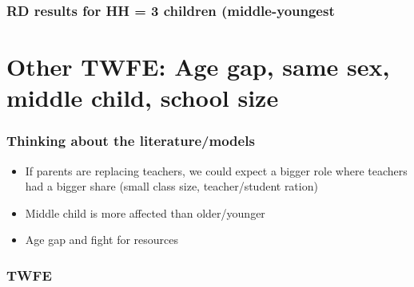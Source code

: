 \documentclass{beamer}
\begin{document}
\begin{frame}
    \frametitle{RD results for HH = 3 children (middle-youngest}
    
\end{frame}



\section{Other TWFE: Age gap, same sex, middle child, school size}

\begin{frame}
    \label{update_scott}
    \frametitle{Thinking about the literature/models}
    \begin{itemize}
        \item If parents are replacing teachers, we could expect a bigger role where teachers had a bigger share (small class size, teacher/student ration)
        \item Middle child is more affected than older/younger
        \item Age gap and fight for resources
    \end{itemize}
\end{frame}


\begin{frame}
    \label{update_scott}
    \frametitle{TWFE}
 {
    }
\end{frame}
\end{document}
